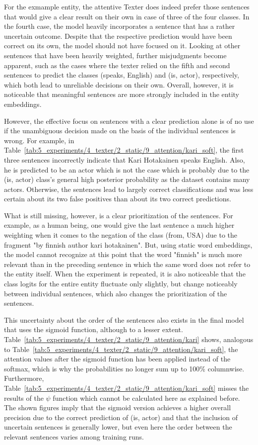 For the exmample entity, the attentive Texter does indeed prefer those sentences that would give a clear result on their own in case of three of the four classes. In the fourth case, the model heavily incorporates a sentence that has a rather uncertain outcome. Despite that the respective prediction would have been correct on its own, the model should not have focused on it. Looking at other sentences that have been heavily weighted, further misjudgments become apparent, such as the cases where the texter relied on the fifth and second sentences to predict the classes (speaks, English) and (is, actor), respectively, which both lead to unreliable decisions on their own. Overall, however, it is noticeable that meaningful sentences are more strongly included in the entity embeddings.

However, the effective focus on sentences with a clear prediction alone is of no use if the unambiguous decision made on the basis of the individual sentences is wrong. For example, in Table~\ref{tab:5_experiments/4_texter/2_static/9_attention/kari_soft}, the first three sentences incorrectly indicate that Kari Hotakainen speaks English. Also, he is predicted to be an actor which is not the case which is probably due to the (is, actor) class's general high posterior probability as the dataset contains many actors. Otherwise, the sentences lead to largely correct classifications and was less certain about its two false positives than about its two correct predictions.

What is still missing, however, is a clear prioritization of the sentences. For example, as a human being, one would give the last sentence a much higher weighting when it comes to the negation of the class (from, USA) due to the fragment "by finnish author kari hotakainen". But, using static word embeddings, the model cannot recognize at this point that the word "finnish" is much more relevant than in the preceding sentence in which the same word does not refer to the entity itself. When the experiment is repeated, it is also noticeable that the class logits for the entire entity fluctuate only slightly, but change noticeably between individual sentences, which also changes the prioritization of the sentences.

This uncertainty about the order of the sentences also exists in the final model that uses the sigmoid function, although to a lesser extent. Table~\ref{tab:5_experiments/4_texter/2_static/9_attention/kari} shows, analogous to Table~\ref{tab:5_experiments/4_texter/2_static/9_attention/kari_soft}, the attention values after the sigmoid function has been applied instead of the softmax, which is why the probabilities no longer sum up to 100\% columnwise. Furthermore, Table~\ref{tab:5_experiments/4_texter/2_static/9_attention/kari_soft} misses the results of the $\psi$ function which cannot be calculated here as explained before. The shown figures imply that the sigmoid version achieves a higher overall precision due to the correct prediction of (is, actor) and that the inclusion of uncertain sentences is generally lower, but even here the order between the relevant sentences varies among training runs.

